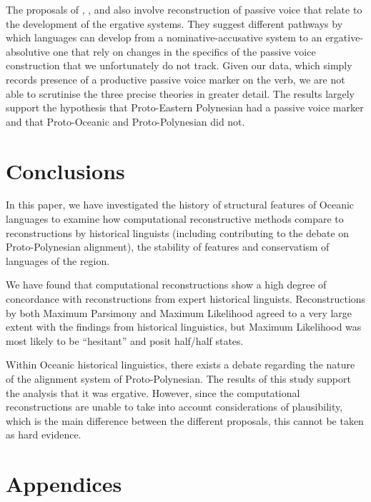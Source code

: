 \documentclass[a4paper,10pt]{article} %
\begin{document}
The proposals of \citet{hale_1968}, \citet{hohepa_1967, hohepa_1969}, and \citet{chung1978} also involve reconstruction of passive voice that relate to the development of the ergative systems. They suggest different pathways by which languages can develop from a nominative-accusative system to an ergative-absolutive one that rely on changes in the specifics of the passive voice construction that we unfortunately do not track. Given our data, which simply records presence of a productive passive voice marker on the verb, we are not able to scrutinise the three precise theories in greater detail. The results largely support the hypothesis that Proto-Eastern Polynesian had a passive voice marker and that Proto-Oceanic and Proto-Polynesian did not. %


\section{Conclusions}
In this paper, we have investigated the history of structural features of Oceanic languages to examine how computational reconstructive methods compare to reconstructions by historical linguists (including contributing to the debate on Proto-Polynesian alignment), the stability of features and conservatism of languages of the region.

We have found that computational reconstructions show a high degree of concordance with reconstructions from expert historical linguists. Reconstructions by both Maximum Parsimony and Maximum Likelihood agreed to a very large extent with the findings from historical linguistics, but Maximum Likelihood was most likely to be ``hesitant'' and posit half/half states.

Within Oceanic historical linguistics, there exists a debate regarding the nature of the alignment system of Proto-Polynesian. The results of this study support the analysis that it was ergative. However, since the computational reconstructions are unable to take into account considerations of plausibility, which is the main difference between the different proposals, this cannot be taken as hard evidence.


\newpage

\singlespacing




\newpage
\singlespacing
\appendix
\section*{Appendices}
\renewcommand{\thesubsection}{\Alph{subsection}}
\end{document}
